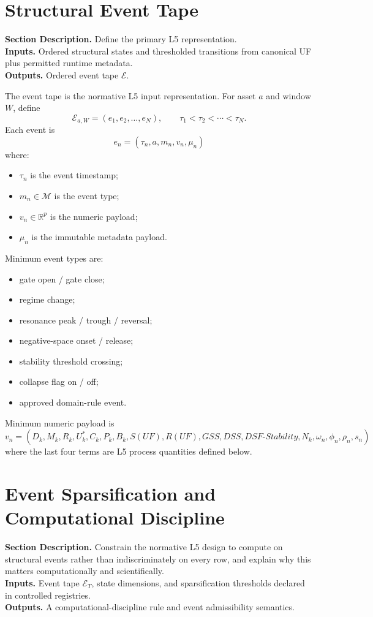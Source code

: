 \documentclass[11pt]{report}
\newcommand{\R}{\mathbb{R}}
\newcommand{\E}{\mathcal{E}}
\newcommand{\meta}[3]{\textbf{Section Description.} #1\\
\textbf{Inputs.} #2\\
\textbf{Outputs.} #3\par}
\begin{document}
\section{Structural Event Tape}
\meta{Define the primary L5 representation.}{Ordered structural states and thresholded transitions from canonical UF plus permitted runtime metadata.}{Ordered event tape $\E$.}

The event tape is the normative L5 input representation. For asset $a$ and window $W$, define
\[
\E_{a,W}=(e_1,e_2,\dots,e_N),\qquad \tau_1<\tau_2<\cdots<\tau_N.
\]
Each event is
\[
e_n=(\tau_n,a,m_n,v_n,\mu_n)
\]
where:
\begin{itemize}
    \item $\tau_n$ is the event timestamp;
    \item $m_n\in\mathcal{M}$ is the event type;
    \item $v_n\in\R^{p}$ is the numeric payload;
    \item $\mu_n$ is the immutable metadata payload.
\end{itemize}

Minimum event types are:
\begin{itemize}
    \item gate open / gate close;
    \item regime change;
    \item resonance peak / trough / reversal;
    \item negative-space onset / release;
    \item stability threshold crossing;
    \item collapse flag on / off;
    \item approved domain-rule event.
\end{itemize}

Minimum numeric payload is
\[
v_n = (D_k,M_k,R_k,U_k^{\ast},C_k,P_k,B_k,S(UF),R(UF),GSS,DSS,DSF\text{-}Stability,N_k,\omega_n,\phi_n,\rho_n,s_n)
\]
where the last four terms are L5 process quantities defined below.


\section{Event Sparsification and Computational Discipline}
\meta{Constrain the normative L5 design to compute on structural events rather than indiscriminately on every row, and explain why this matters computationally and scientifically.}{Event tape $\mathcal{E}_T$, state dimensions, and sparsification thresholds declared in controlled registries.}{A computational-discipline rule and event admissibility semantics.}
\end{document}
